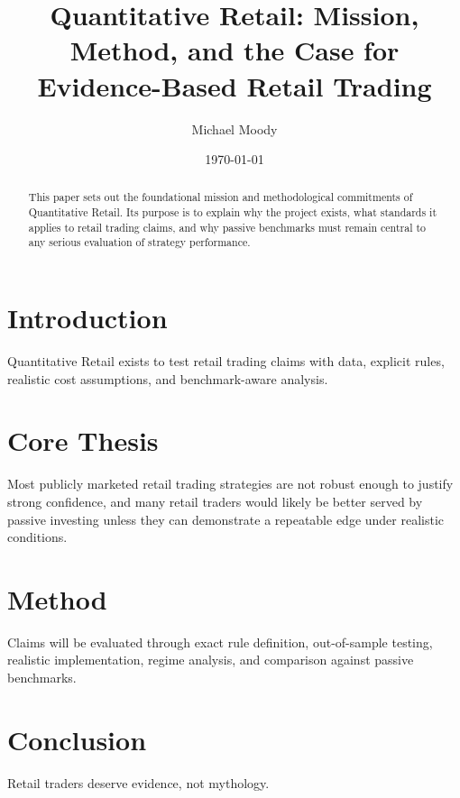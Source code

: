 \documentclass[11pt]{article}
\title{\textbf{Quantitative Retail: Mission, Method, and the Case for Evidence-Based Retail Trading}}\author{Michael Moody}\date{\today}
\begin{document}
\maketitle

\begin{abstract}
This paper sets out the foundational mission and methodological commitments of Quantitative Retail. Its purpose is to explain why the project exists, what standards it applies to retail trading claims, and why passive benchmarks must remain central to any serious evaluation of strategy performance.
\end{abstract}

\section{Introduction}
Quantitative Retail exists to test retail trading claims with data, explicit rules, realistic cost assumptions, and benchmark-aware analysis.

\section{Core Thesis}
Most publicly marketed retail trading strategies are not robust enough to justify strong confidence, and many retail traders would likely be better served by passive investing unless they can demonstrate a repeatable edge under realistic conditions.

\section{Method}
Claims will be evaluated through exact rule definition, out-of-sample testing, realistic implementation, regime analysis, and comparison against passive benchmarks.

\section{Conclusion}
Retail traders deserve evidence, not mythology.
\end{document}
